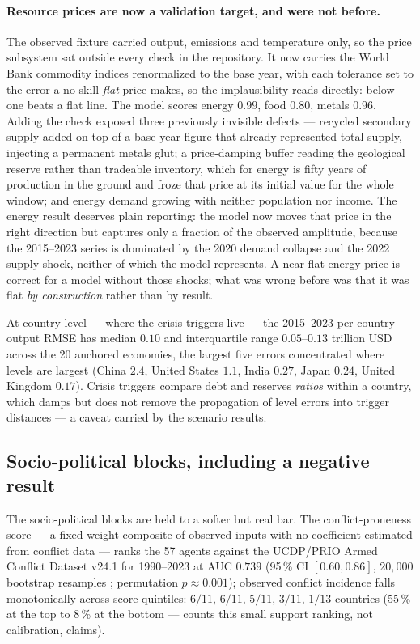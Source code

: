 \documentclass[12pt,a4paper]{article}
\newcommand{\priceEnergy}{0.99}        \newcommand{\priceFood}{0.80}
\newcommand{\priceMetals}{0.96}
\newcommand{\aucComposite}{0.739} \newcommand{\aucRegime}{0.776}
\begin{document}
\paragraph{Resource prices are now a validation target, and were not before.} The observed
fixture carried output, emissions and temperature only, so the price subsystem sat outside
every check in the repository. It now carries the World Bank commodity indices
\citep{worldbank_pinksheet} renormalized to the base year, with each tolerance set to the error
a no-skill \emph{flat} price makes, so the implausibility reads directly: below one beats a
flat line. The model scores energy $\priceEnergy$, food $\priceFood$, metals $\priceMetals$.
Adding the check exposed three previously invisible defects --- recycled secondary supply added
on top of a base-year figure that already represented total supply, injecting a permanent
metals glut; a price-damping buffer reading the geological reserve rather than tradeable
inventory, which for energy is fifty years of production in the ground and froze that price at
its initial value for the whole window; and energy demand growing with neither population nor
income. The energy result deserves plain reporting: the model now moves that price in the right
direction but captures only a fraction of the observed amplitude, because the 2015--2023 series
is dominated by the 2020 demand collapse and the 2022 supply shock, neither of which the model
represents. A near-flat energy price is correct for a model without those shocks; what was
wrong before was that it was flat \emph{by construction} rather than by result.

At country level --- where the crisis triggers live --- the 2015--2023 per-country output RMSE
has median $0.10$ and interquartile range $0.05$--$0.13$ trillion USD across the 20 anchored
economies, the largest five errors concentrated where levels are largest (China $2.4$, United
States $1.1$, India $0.27$, Japan $0.24$, United Kingdom $0.17$). Crisis triggers compare debt
and reserves \emph{ratios} within a country, which damps but does not remove the propagation of
level errors into trigger distances --- a caveat carried by the scenario results.

\subsection{Socio-political blocks, including a negative result}

The socio-political blocks are held to a softer but real bar. The conflict-proneness score ---
a fixed-weight composite of observed inputs with no coefficient estimated from conflict data
--- ranks the 57 agents against the UCDP/PRIO Armed Conflict Dataset v24.1 for 1990--2023
\citep{gleditsch2002,davies2024} at AUC $\aucComposite$ (95\,\% CI $[0.60,0.86]$, $20{,}000$
bootstrap resamples \citep{efron1993}; permutation $p\approx0.001$); observed conflict
incidence falls monotonically across score quintiles: $6/11$, $6/11$, $5/11$, $3/11$, $1/13$
countries (55\,\% at the top to 8\,\% at the bottom --- counts this small support ranking, not
calibration, claims).
\end{document}
